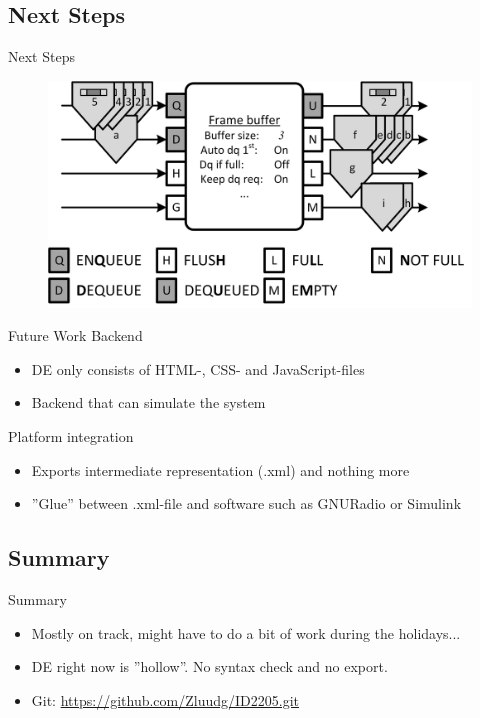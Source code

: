 \documentclass{beamer}
\begin{document}
\subsection{Next Steps}
\begin{frame}{Next Steps}
	\begin{figure}
 		\includegraphics[width=\linewidth]{frame_buffer.png}
 		\label{fig:frame_buffer}
	\end{figure}
\end{frame}

\begin{frame}{Future Work}
	Backend
	\begin{itemize}
		\item DE only consists of HTML-, CSS- and JavaScript-files
		\item<2-> Backend that can simulate the system
	\end{itemize}
	Platform integration
	\begin{itemize}
		\item Exports intermediate representation (.xml) and nothing more
		\item<3-> ''Glue'' between .xml-file and software such as GNURadio or Simulink
	\end{itemize}
\end{frame}

\subsection*{Summary}
\begin{frame}{Summary}
\begin{itemize}
	\item Mostly on track, might have to do a bit of work during the holidays...
	\item DE right now is ''hollow''. No syntax check and no export.
	\item Git: \url{https://github.com/Zluudg/ID2205.git}
\end{itemize}
\end{frame}
\end{document}
